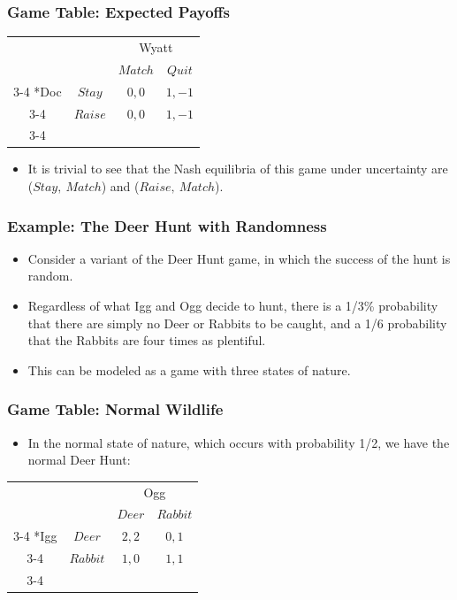 \begin{frame}
\frametitle{Game Table: Expected Payoffs}
\begin{table}[h]
\centering
 
\begin{tabular}{cc|c|c|}
& \multicolumn{1}{c}{} & \multicolumn{2}{c}{Wyatt}\\
& \multicolumn{1}{c}{} & \multicolumn{1}{c}{$Match$}  & \multicolumn{1}{c}{$Quit$} \\\cline{3-4}
\multirow{2}*{Doc}  & $Stay$ & $0, 0$ & $1, -1$ \\\cline{3-4}
& $Raise$ & $0, 0$ & $1,-1$ \\\cline{3-4}
\end{tabular}
\end{table}
\begin{itemize}
\item It is trivial to see that the Nash equilibria of this game under uncertainty are ($Stay,~Match$) and ($Raise,~Match$).
\end{itemize}
\end{frame}


\begin{frame}
\frametitle{Example: The Deer Hunt with Randomness}
\begin{itemize}
\item Consider a variant of the Deer Hunt game, in which the success of the hunt is random.
\item Regardless of what Igg and Ogg decide to hunt, there is a 1/3\% probability that there are simply no Deer or Rabbits to be caught, and a 1/6 probability that the Rabbits are four times as plentiful.
\item This can be modeled as a game with three states of nature.
\end{itemize}
\end{frame}


\begin{frame}
\frametitle{Game Table: Normal Wildlife}
\begin{itemize}
\item In the normal state of nature, which occurs with probability 1/2, we have the normal Deer Hunt:
\end{itemize}
\begin{table}[h]
\centering
 

\begin{tabular}{cc|c|c|}
	& \multicolumn{1}{c}{} & \multicolumn{2}{c}{Ogg}\\
	& \multicolumn{1}{c}{} & \multicolumn{1}{c}{$Deer$}  & \multicolumn{1}{c}{$Rabbit$} \\\cline{3-4}
	\multirow{2}*{Igg}  & $Deer$ & $2, 2$ & $0, 1$ \\\cline{3-4}
	& $Rabbit$ & $1, 0$ & $1, 1$ \\\cline{3-4}
\end{tabular}
\end{table}
\end{frame}


